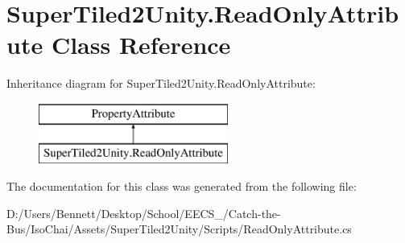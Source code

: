 \hypertarget{class_super_tiled2_unity_1_1_read_only_attribute}{}\section{Super\+Tiled2\+Unity.\+Read\+Only\+Attribute Class Reference}
\label{class_super_tiled2_unity_1_1_read_only_attribute}
Inheritance diagram for Super\+Tiled2\+Unity.\+Read\+Only\+Attribute\+:\begin{figure}[H]
\begin{center}
\leavevmode
\includegraphics[height=2.000000cm]{class_super_tiled2_unity_1_1_read_only_attribute}
\end{center}
\end{figure}


The documentation for this class was generated from the following file\+:\begin{DoxyCompactItemize}
\item 
D\+:/\+Users/\+Bennett/\+Desktop/\+School/\+E\+E\+C\+S\+\_/\+Catch-\/the-\/\+Bus/\+Iso\+Chai/\+Assets/\+Super\+Tiled2\+Unity/\+Scripts/Read\+Only\+Attribute.\+cs\end{DoxyCompactItemize}
